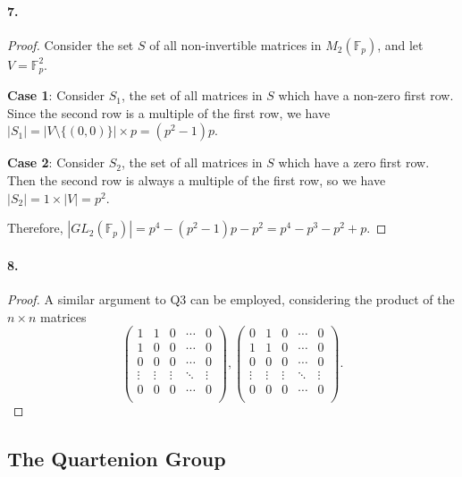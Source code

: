 \documentclass{article}
\begin{document}
\paragraph{7.}
\begin{proof}
  Consider the set $S$ of all non-invertible matrices in $M_2(\mathbb{F}_p)$,
  and let $V = \mathbb{F}_p^2$.

  \textbf{Case 1}: Consider $S_1$, the set of all matrices in $S$ which have a
  non-zero first row. Since the second row is a multiple of the first row, we
  have $|S_1| = |V \setminus\{(0, 0)\}| \times p = (p^2 - 1)p$.

  \textbf{Case 2}: Consider $S_2$, the set of all matrices in $S$ which have a
  zero first row. Then the second row is always a multiple of the first row, so
  we have $|S_2| = 1 \times |V| = p^2$.

  Therefore, $|GL_2(\mathbb{F}_p)| = p^4 - (p^2 - 1)p - p^2 = p^4 - p^3 - p^2 +
  p$.
\end{proof}

\paragraph{8.}
\begin{proof}
  A similar argument to Q3 can be employed, considering the product of the
  $n \times n$ matrices \[
    \begin{pmatrix}
      1 & 1 & 0 & \cdots & 0 \\
      1 & 0 & 0 & \cdots & 0 \\
      0 & 0 & 0 & \cdots & 0 \\
      \vdots & \vdots & \vdots & \ddots & \vdots \\
      0 & 0 & 0 & \cdots & 0 \\
    \end{pmatrix},
    \begin{pmatrix}
      0 & 1 & 0 & \cdots & 0 \\
      1 & 1 & 0 & \cdots & 0 \\
      0 & 0 & 0 & \cdots & 0 \\
      \vdots & \vdots & \vdots & \ddots & \vdots \\
      0 & 0 & 0 & \cdots & 0 \\
    \end{pmatrix}.
  \]
\end{proof}

\subsection{The Quartenion Group}
\end{document}
